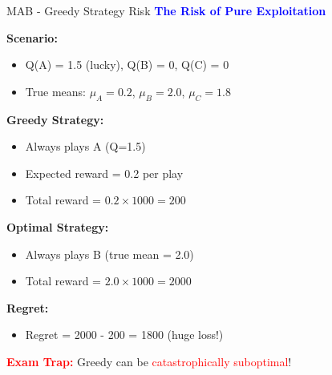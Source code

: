 \documentclass[8pt]{beamer}
\begin{document}
	\begin{frame}{MAB - Greedy Strategy Risk}
		\fontsize{6.5}{7.5}\selectfont
		\textcolor{blue}{\textbf{The Risk of Pure Exploitation}}
		
		\textbf{Scenario:}
		\begin{itemize}
			\item Q(A) = 1.5 (lucky), Q(B) = 0, Q(C) = 0
			\item True means: $\mu_A = 0.2$, $\mu_B = 2.0$, $\mu_C = 1.8$
		\end{itemize}
		
		\textbf{Greedy Strategy:}
		\begin{itemize}
			\item Always plays A (Q=1.5)
			\item Expected reward = 0.2 per play
			\item Total reward = $0.2 \times 1000 = 200$
		\end{itemize}
		
		\textbf{Optimal Strategy:}
		\begin{itemize}
			\item Always plays B (true mean = 2.0)
			\item Total reward = $2.0 \times 1000 = 2000$
		\end{itemize}
		
		\textbf{Regret:}
		\begin{itemize}
			\item Regret = 2000 - 200 = 1800 (huge loss!)
		\end{itemize}
		
		\textcolor{red}{\textbf{Exam Trap:}} Greedy can be \textcolor{red}{catastrophically suboptimal}!
	\end{frame}
	
\end{document}
